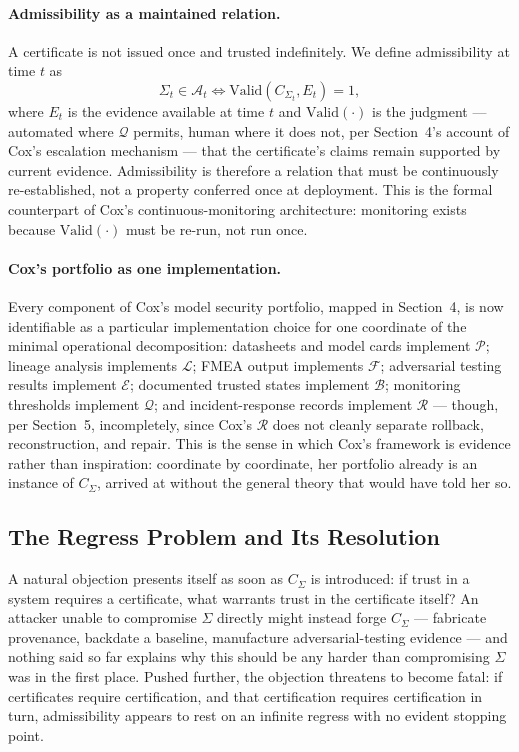 \documentclass[11pt]{article}
\begin{document}
\paragraph{Admissibility as a maintained relation.} A certificate is not issued once and trusted indefinitely. We define admissibility at time $t$ as
\begin{equation}
\Sigma_t \in \mathcal{A}_t \iff \mathrm{Valid}(C_{\Sigma_t}, E_t) = 1,
\end{equation}
where $E_t$ is the evidence available at time $t$ and $\mathrm{Valid}(\cdot)$ is the judgment --- automated where $\mathcal{Q}$ permits, human where it does not, per Section~4's account of Cox's escalation mechanism --- that the certificate's claims remain supported by current evidence. Admissibility is therefore a relation that must be continuously re-established, not a property conferred once at deployment. This is the formal counterpart of Cox's continuous-monitoring architecture: monitoring exists because $\mathrm{Valid}(\cdot)$ must be re-run, not run once.

\paragraph{Cox's portfolio as one implementation.} Every component of Cox's model security portfolio, mapped in Section~4, is now identifiable as a particular implementation choice for one coordinate of the minimal operational decomposition: datasheets and model cards implement $\mathcal{P}$; lineage analysis implements $\mathcal{L}$; FMEA output implements $\mathcal{F}$; adversarial testing results implement $\mathcal{E}$; documented trusted states implement $\mathcal{B}$; monitoring thresholds implement $\mathcal{Q}$; and incident-response records implement $\mathcal{R}$ --- though, per Section~5, incompletely, since Cox's $\mathcal{R}$ does not cleanly separate rollback, reconstruction, and repair. This is the sense in which Cox's framework is evidence rather than inspiration: coordinate by coordinate, her portfolio already is an instance of $C_\Sigma$, arrived at without the general theory that would have told her so.

\subsection{The Regress Problem and Its Resolution}

A natural objection presents itself as soon as $C_\Sigma$ is introduced: if trust in a system requires a certificate, what warrants trust in the certificate itself? An attacker unable to compromise $\Sigma$ directly might instead forge $C_\Sigma$ --- fabricate provenance, backdate a baseline, manufacture adversarial-testing evidence --- and nothing said so far explains why this should be any harder than compromising $\Sigma$ was in the first place. Pushed further, the objection threatens to become fatal: if certificates require certification, and that certification requires certification in turn, admissibility appears to rest on an infinite regress with no evident stopping point.
\end{document}
